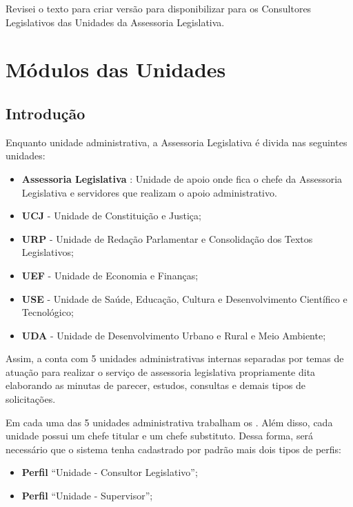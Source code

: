 Revisei o texto para criar versão para disponibilizar para os Consultores Legislativos das Unidades da Assessoria Legislativa.


\chapter{Módulos das Unidades}
\label{detalhes:modulos-unid}

\section{Introdução}

Enquanto unidade administrativa, a Assessoria Legislativa é divida nas seguintes unidades:

\begin{itemize}
	\item \textbf{Assessoria Legislativa} : Unidade de apoio onde fica o chefe da Assessoria Legislativa e servidores que realizam o apoio administrativo. 
	\item \textbf{UCJ} - Unidade de Constituição e Justiça;
	\item \textbf{URP} - Unidade de Redação Parlamentar e Consolidação dos Textos Legislativos;
	\item \textbf{UEF} - Unidade de Economia e Finanças;
	\item \textbf{USE} - Unidade de Saúde, Educação, Cultura e Desenvolvimento Científico e Tecnológico; 
	\item \textbf{UDA} - Unidade de Desenvolvimento Urbano e Rural e Meio Ambiente;	
\end{itemize}

Assim, a \ASSEL \xspace conta com  5 unidades administrativas internas separadas por temas de atuação para realizar o serviço de assessoria legislativa propriamente dita elaborando as minutas de parecer, estudos, consultas e demais tipos de solicitações.

Em cada uma das 5 unidades administrativa trabalham os \CLs. Além disso, cada unidade possui um chefe titular e um chefe substituto. Dessa forma, será necessário que o sistema tenha cadastrado por padrão mais dois tipos de perfis:

\begin{itemize}
	\item \textbf{Perfil} ``Unidade - Consultor Legislativo'';
	\item \textbf{Perfil} ``Unidade - Supervisor'';
\end{itemize}

